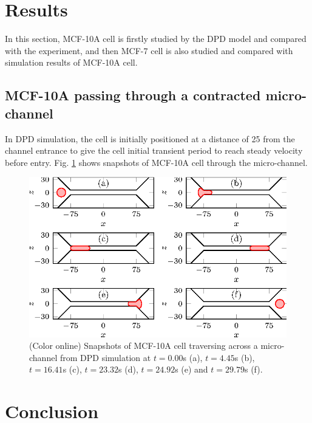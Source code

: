 \documentclass[%
 reprint,
 amsmath,amssymb,
 aps,
]{revtex4-1}
\begin{document}

\section{Results}\label{results}
In this section, MCF-10A cell is firstly studied by the DPD model and compared with the experiment, and then MCF-7 cell is also studied and compared with simulation results of MCF-10A cell. 

\subsection{MCF-10A passing through a contracted micro-channel}
In DPD simulation, the cell is initially positioned at a distance of 25 from the channel entrance to give the cell initial transient period to reach steady velocity before entry. Fig. \ref{fig:Snapshots-DPD} shows snapshots of MCF-10A cell through the micro-channel.
\begin{figure}[!htb]
\centering
\includegraphics{Snapshots-DPD.eps}
\caption{(Color online) Snapshots of MCF-10A cell traversing across a micro-channel from DPD simulation at $t=0.00$s (a), $t=4.45$s (b), $t=16.41$s (c), $t=23.32$s (d), $t=24.92$s (e) and $t=29.79$s (f).} \label{fig:Snapshots-DPD}
\end{figure}



\section{Conclusion}\label{conclusion}
\end{document}
